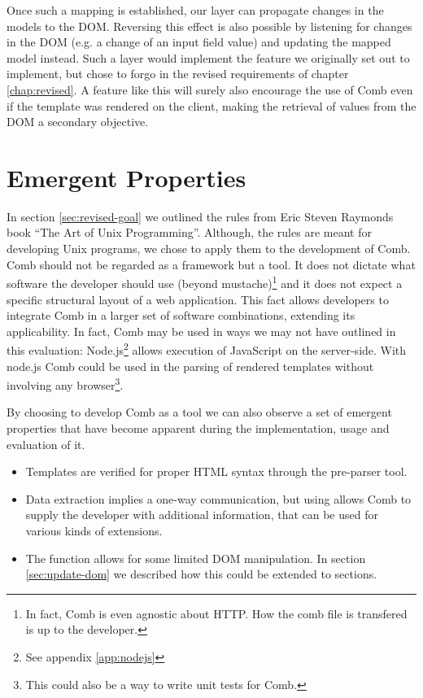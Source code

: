 \documentclass[thesis.tex]{subfiles}
\begin{document}
Once such a mapping is established, our layer can propagate changes in the
models to the DOM. Reversing this effect is also possible by listening for
changes in the DOM (e.g. a change of an input field value) and updating the
mapped model instead.
Such a layer would implement the feature we originally set out to implement,
but chose to forgo in the revised requirements of chapter \ref{chap:revised}.
A feature like this will surely also encourage the use of Comb even if the
template was rendered on the client, making the retrieval of values from the DOM
a secondary objective.



\section{Emergent Properties}
\label{sec:emergent}
In section \ref{sec:revised-goal} we outlined the rules from
Eric Steven Raymonds book ``The Art of Unix Programming''.
Although, the rules are meant for developing Unix programs,
we chose to apply them to the development of Comb.
Comb should not be regarded as a framework but a tool. It does not dictate what
software the developer should use (beyond mustache)\footnote{In fact,
Comb is even agnostic about HTTP. How the comb file is transfered is up to
the developer.} and it does not expect a specific structural layout of
a web application.
This fact allows developers to integrate Comb in a larger set of software
combinations, extending its applicability.
In fact, Comb may be used in ways we may not have outlined in this evaluation:
Node.js\footnote{See appendix \ref{app:nodejs}} allows execution of JavaScript
on the server-side. With node.js Comb could be used in the parsing of rendered
templates without involving any browser\footnote{This could also be a way to
write unit tests for Comb.}.

By choosing to develop Comb as a tool we can also observe a set of emergent
properties that have become apparent during the implementation, usage and
evaluation of it.

\begin{itemize}
\item Templates are verified for proper HTML syntax through the pre-parser tool.
\item Data extraction implies a one-way communication, but using
       allows Comb to supply the developer with additional
      information, that can be used for various kinds of extensions.
\item The  function allows for some limited DOM manipulation.
      In section \ref{sec:update-dom} we described how this could be extended to
      sections.
\end{itemize}
\end{document}
